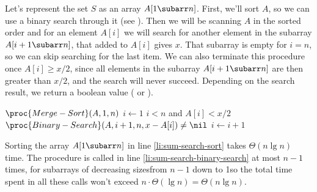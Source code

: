 Let's represent the set $S$ as an array $A[1\subarr n]$.
First, we'll sort $A$, so we can use a binary search through it (see ).
Then we will be scanning $A$ in the sorted order and for an element $A[i]$ we will search for another element in the subarray $A[i+1\subarr n]$, that added to $A[i]$ gives $x$.
That subarray is empty for $i=n$, so we can skip searching for the last item.
We can also terminate this procedure once $A[i]\ge x/2$, since all elements in the subarray $A[i+1\subarr n]$ are then greater than $x/2$, and the search will never succeed.
Depending on the search result, we return a boolean value ( or ).

\begin{codebox}
\li $\proc{Merge-Sort}(A,1,n)$ \label{li:sum-search-sort}
\li $i\gets1$
\li \While $i<n$ and $A[i]<x/2$
\li     \Do \If $\proc{Binary-Search}(A,i+1,n,x-A[i])\ne\nil$ \label{li:sum-search-binary-search}
\li             \Then \Return {}
                \End
\li         $i\gets i+1$
        \End
\li \Return {}
\end{codebox}

Sorting the array $A[1\subarr n]$ in line \ref{li:sum-search-sort} takes $\Theta(n\lg n)$ time.
The procedure  is called in line \ref{li:sum-search-binary-search} at most $n-1$ times, for subarrays of decreasing sizes\dash from $n-1$ down to 1\dash so the total time spent in all these calls won't exceed $n\cdot\Theta(\lg n)=\Theta(n\lg n)$.
